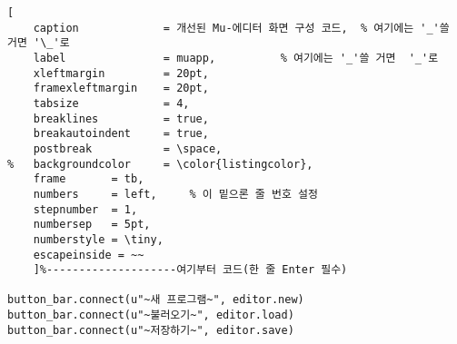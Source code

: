 \captionsetup[lstlisting]{format=mylst, labelfont=bf, singlelinecheck=off} %
\renewcommand{\thelstlisting}{\arabic{section}.\arabic{lstlisting}}

\begin{lstlisting}[
	caption				= 개선된 Mu-에디터 화면 구성 코드,	% 여기에는 '_'쓸 거면 '\_'로
	label				= muapp,          % 여기에는 '_'쓸 거면  '_'로
	xleftmargin			= 20pt,
	framexleftmargin	= 20pt,
	tabsize				= 4,
	breaklines			= true,
	breakautoindent		= true,
	postbreak			= \space,
%	backgroundcolor		= \color{listingcolor}, 
	frame		= tb,
	numbers		= left,		% 이 밑으론 줄 번호 설정
	stepnumber	= 1,
	numbersep	= 5pt,
	numberstyle	= \tiny,
	escapeinside = ~~
	]%--------------------여기부터 코드(한 줄 Enter 필수)
		
button_bar.connect(u"~새 프로그램~", editor.new)
button_bar.connect(u"~불러오기~", editor.load)
button_bar.connect(u"~저장하기~", editor.save)
\end{lstlisting}
